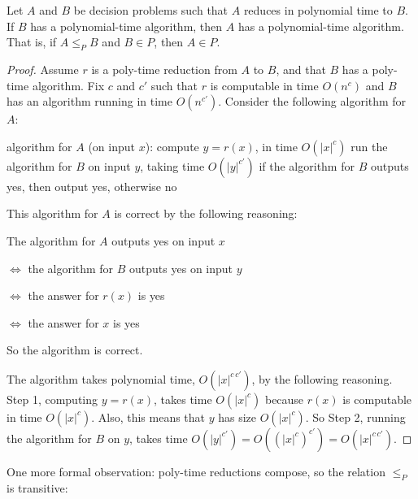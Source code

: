 \begin{lemma}\label{flow: reduction}
  Let $A$ and $B$ be decision problems
  such that $A$ reduces in polynomial time to $B$.
  If $B$ has a polynomial-time algorithm,
  then $A$ has a polynomial-time algorithm.
  That is, if $A \le_P B$ and $B\in P$, then $A\in P$.
\end{lemma}
\begin{proof}
  Assume $r$ is a poly-time reduction from $A$ to $B$,
  and that $B$ has a poly-time algorithm.
  Fix $c$ and $c'$ such that $r$ is computable in time $O(n^c)$
  and $B$ has an algorithm running in time $O(n^{c'})$.
  Consider the following algorithm for $A$:
  \begin{myframed}
    \begin{steps}
    \item[] algorithm for $A$ (on input $x$):
      \step compute $y= r(x)$, in time $O(|x|^c)$
      \step run the algorithm
      for $B$ on input $y$, taking time $O(|y|^{c'})$
      \step if the algorithm for $B$ outputs \textsf{yes}, then output \textsf{yes}, otherwise \textsf{no}
    \end{steps}
  \end{myframed}
  \smallskip
  
  This algorithm for $A$ is correct by the following reasoning:

  The algorithm for $A$ outputs \textsf{yes} on input $x$

  $\iff$ the algorithm for $B$ outputs \textsf{yes} on input $y$

  $\iff$ the answer for $r(x)$ is \textsf{yes}

  $\iff$ the answer for $x$ is \textsf{yes}

  So the algorithm is correct.
  
  The algorithm takes polynomial time, $O(|x|^{c\,c'})$, by the following reasoning.
  Step 1, computing $y=r(x)$, takes time $O(|x|^c)$
  because $r(x)$ is computable in time $O(|x|^c)$.
  Also, this means that $y$ has size $O(|x|^c)$.
  So Step 2, running the algorithm for $B$ on $y$,
  takes time $O(|y|^{c'}) = O( (|x|^c)^{c'}) = O(|x|^{c\,c'})$.
\end{proof}

One more formal observation:
poly-time reductions compose,
so the relation $\le_P$ is transitive:


